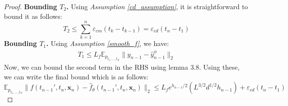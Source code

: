 \documentclass[11pt]{article}
\def\rvx{{\mathbf{x}}}
\newcommand{\E}{\mathbb{E}}
\begin{document}
\begin{proof}
\noindent
\textbf{Bounding $T_2$.} Using \textit{Assumption \ref{cd_assumption}}, it is straightforward to bound it as follows:
\[
T_2 \leq \sum_{k=1}^n\varepsilon_{cm}(t_k-t_{k-1}) = \varepsilon_{cd}(t_n-t_1)
\] 
\textbf{Bounding $T_1$.} Using \textit{Assumption \ref{smooth_f}}, we have:
\begin{align}
    T_1 \leq  L_f \mathbb{E}_{p_{t_1,...,t_N}} \|y_{n-1}-\hat{y}^\phi_{n-1}\|_2 
\end{align}
Now, we can bound the second term in the RHS using lemma 3.8. Using  these, we can write the final bound which is as follows:
\[
\E_{p_{t_1,...,t_N}}  
  \|
  f(t_{n-1}',t_n,{\rvx}_n)-\hat{f}_\theta(t_{n-1}',t_n,{\rvx}_n)\|_2 \leq L_fe^{{h_{n-1}}/{2}}(L^{{3}/{2}}d^{{1}/{2}}h_{n-1}) + \varepsilon_{cd}(t_n-t_1)
\]
\end{proof}
\end{document}
